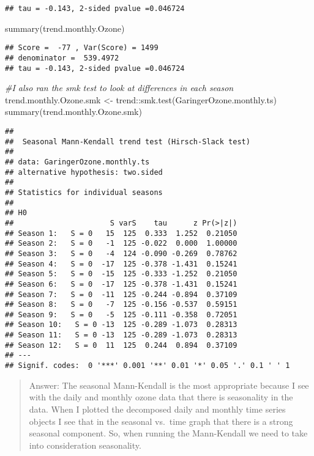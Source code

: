 \documentclass[
]{article}
\newenvironment{Shaded}{\begin{snugshade}}{\end{snugshade}}
\newcommand{\CommentTok}[1]{\textcolor[rgb]{0.56,0.35,0.01}{\textit{#1}}}
\newcommand{\FunctionTok}[1]{\textcolor[rgb]{0.00,0.00,0.00}{#1}}
\newcommand{\NormalTok}[1]{#1}
\newcommand{\OtherTok}[1]{\textcolor[rgb]{0.56,0.35,0.01}{#1}}
\newcommand{\SpecialCharTok}[1]{\textcolor[rgb]{0.00,0.00,0.00}{#1}}
\begin{document}
\begin{verbatim}
## tau = -0.143, 2-sided pvalue =0.046724
\end{verbatim}

\begin{Shaded}
\begin{Highlighting}[]
\FunctionTok{summary}\NormalTok{(trend.monthly.Ozone)}
\end{Highlighting}
\end{Shaded}

\begin{verbatim}
## Score =  -77 , Var(Score) = 1499
## denominator =  539.4972
## tau = -0.143, 2-sided pvalue =0.046724
\end{verbatim}

\begin{Shaded}
\begin{Highlighting}[]
\CommentTok{\#I also ran the smk test to look at differences in each season}
\NormalTok{trend.monthly.Ozone.smk }\OtherTok{\textless{}{-}}\NormalTok{ trend}\SpecialCharTok{::}\FunctionTok{smk.test}\NormalTok{(GaringerOzone.monthly.ts)}
\FunctionTok{summary}\NormalTok{(trend.monthly.Ozone.smk)}
\end{Highlighting}
\end{Shaded}

\begin{verbatim}
## 
##  Seasonal Mann-Kendall trend test (Hirsch-Slack test)
## 
## data: GaringerOzone.monthly.ts
## alternative hypothesis: two.sided
## 
## Statistics for individual seasons
## 
## H0
##                      S varS    tau      z Pr(>|z|)  
## Season 1:   S = 0   15  125  0.333  1.252  0.21050  
## Season 2:   S = 0   -1  125 -0.022  0.000  1.00000  
## Season 3:   S = 0   -4  124 -0.090 -0.269  0.78762  
## Season 4:   S = 0  -17  125 -0.378 -1.431  0.15241  
## Season 5:   S = 0  -15  125 -0.333 -1.252  0.21050  
## Season 6:   S = 0  -17  125 -0.378 -1.431  0.15241  
## Season 7:   S = 0  -11  125 -0.244 -0.894  0.37109  
## Season 8:   S = 0   -7  125 -0.156 -0.537  0.59151  
## Season 9:   S = 0   -5  125 -0.111 -0.358  0.72051  
## Season 10:   S = 0 -13  125 -0.289 -1.073  0.28313  
## Season 11:   S = 0 -13  125 -0.289 -1.073  0.28313  
## Season 12:   S = 0  11  125  0.244  0.894  0.37109  
## ---
## Signif. codes:  0 '***' 0.001 '**' 0.01 '*' 0.05 '.' 0.1 ' ' 1
\end{verbatim}

\begin{quote}
Answer: The seasonal Mann-Kendall is the most appropriate because I see
with the daily and monthly ozone data that there is seasonality in the
data. When I plotted the decomposed daily and monthly time series
objects I see that in the seasonal vs.~time graph that there is a strong
seasonal component. So, when running the Mann-Kendall we need to take
into consideration seasonality.
\end{quote}
\end{document}
